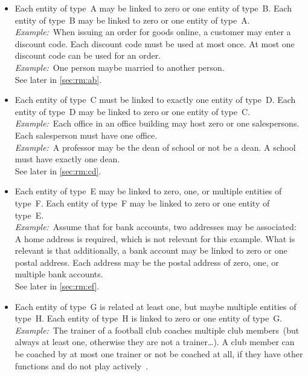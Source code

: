 \begin{itemize}%
%
\item {} %
Each entity of type~A may be linked to zero or one entity of type~B.
Each entity of type~B may be linked to zero or one entity of type~A.~\cite{BS2023G:CFNIERD}\\%
\emph{Example:}~When issuing an order for goods online, a customer may enter a discount code.
Each discount code must be used at most once.
At most one discount code can be used for an order.~\cite{BS2023G:CFNIERD}\\%
\emph{Example:}~One person maybe married to another person.~\cite{R2024CDS:E}\\%
See later in \cref{sec:rm:ab}.%
%
\item {}
Each entity of type~C must be linked to exactly one entity of type~D.
Each entity of type~D may be linked to zero or one entity of type~C.~\cite{T2025CDBMS:ERM}\\%
\emph{Example:}~Each office in an office building may host zero or one salespersons.
Each salesperson must have one office.~\cite{T2025CDBMS:ERM}\\%
\emph{Example:}~A professor may be the dean of school or not be a dean.
A school must have exactly one dean.~\cite{R2024CDS:E}\\%
See later in \cref{sec:rm:cd}.%
%
\item {}
Each entity of type~E may be linked to zero, one, or multiple entities of type~F.
Each entity of type~F may be linked to zero or one entity of type~E.~\cite{MA2006MAC:DMERDED}\\%
\emph{Example:}~Assume that for bank accounts, two addresses may be associated:
A home address is required, which is not relevant for this example.
What is relevant is that additionally, a bank account may be linked to zero or one postal address.
Each address may be the postal address of zero, one, or multiple bank accounts.~\cite{MA2006MAC:DMERDED}\\%
See later in \cref{sec:rm:ef}.%
%
\item {}
Each entity of type~G is related at least one, but maybe multiple entities of type~H.
Each entity of type~H is linked to zero or one entity of type~G.\\%
\emph{Example:}~The trainer of a football club coaches multiple club members~(but always at least one, otherwise they are not a trainer\dots).
A club member can be coached by at most one trainer or not be coached at all, if they have other functions and do not play actively~\cite{SE:DA:2020UTFBRTCACFE}.\\%

\end{itemize}
